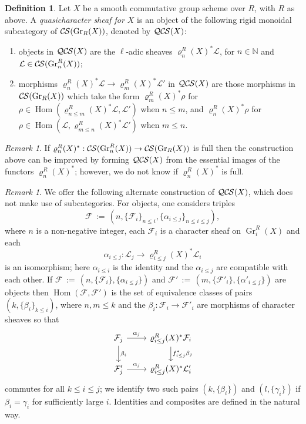 \documentclass[10pt]{amsart}
\theoremstyle{plain}
\theoremstyle{definition}
\newtheorem{definition}[theorem]{Definition}
\theoremstyle{remark}
\newtheorem{remark}[theorem]{Remark}
\newcommand{\NN}{{\mathbb{N}}}
\DeclareMathOperator{\Hom}{Hom}
\DeclareMathOperator{\Gr}{Gr}
\newcommand{\ceq}{{\, :=\, }}
\newcommand{\cs}[1]{{\mathcal{#1}}}
\newcommand{\CS}{{\mathcal{C\hskip-0.8pt S}}}
\newcommand{\QCS}{{\mathcal{QC\hskip-0.8pt S}}}
\begin{document}
\begin{definition}\label{def:QCS}
Let $X$ be a smooth commutative group scheme over $R$, with $R$ as above.
A {\it quasicharacter sheaf for $X$} is an object of
the following rigid monoidal subcategory of $\CS(\Gr_R(X))$, denoted by $\QCS(X)$:
\begin{enumerate}
\item
objects in $\QCS(X)$ are the $\ell$-adic sheaves $\varrho^R_n(X)^*\cs{L}$, for $n\in \NN$ and $\cs{L} \in \CS(\Gr^R_n(X))$; 
\item
morphisms $\varrho^R_n(X)^*\cs{L} \to \varrho^R_m(X)^*\cs{L}'$ in $\QCS(X)$ are those morphisms in $\CS(\Gr_R(X))$ which take the form $\varrho^R_m(X)^*\rho$ for $\rho \in \Hom(\varrho^R_{n\leq m}(X)^*\cs{L},\cs{L}')$ when $n\leq m$, and $\varrho^R_n(X)^*\rho$ for $\rho \in \Hom(\cs{L},\varrho^R_{m\leq n}(X)^*\cs{L}')$ when $m\leq n$.
\end{enumerate}

\end{definition}


\begin{remark}
If $\varrho^R_n(X)^* : \CS(\Gr^R_n(X)) \to \CS(\Gr_R(X))$ is full then the construction above can be improved by forming $\QCS(X)$ from the essential images of the functors $\varrho^R_n(X)^*$; however, we do not know if $\varrho^R_n(X)^*$ is full.
\end{remark}

\begin{remark}
We offer the following alternate construction of $\QCS(X)$, which does not make use of subcategories.
For objects, one considers triples 
\[
\cs{F} \ceq (n, \{\cs{F}_i\}_{n\leq i}, \{\alpha_{i \le j}\}_{n\le i \le j}),
\] where $n$
is a non-negative integer, each $\cs{F}_i$ is a character sheaf on $\Gr^R_i(X)$ and each 
\[
\alpha_{i \le j} : \cs{L}_j \to \varrho^R_{i \le j}(X)^* \cs{L}_i
\]
 is an isomorphism; here $\alpha_{i \le i}$ is the identity and the $\alpha_{i \le j}$ are compatible with each other.  
If $\cs{F} \ceq (n, \{\cs{F}_i\}, \{\alpha_{i \le j}\})$
and $\cs{F}' \ceq (m, \{\cs{F}'_i\}, \{\alpha'_{i \le j}\})$ are objects then $\Hom(\cs{F}, \cs{F}')$ is the set
of equivalence classes of pairs $(k, \{\beta_i\}_{k \le i})$, where $n,m \le k$ and the $\beta_i : \cs{F}_i \to \cs{F}'_i$ are
morphisms of character sheaves so that
\[
\begin{tikzcd}
\cs{F}_j \rar{\alpha_j} \dar{\beta_i} & \varrho^R_{i \le j}(X)^* \cs{F}_i \dar{f_{i \le j}^*\beta_j} \\
\cs{F}'_j \rar{\alpha_j} & \varrho^R_{i \le j}(X)^* \cs{L}'_i
\end{tikzcd}
\]
commutes for all $k\le i\le j$; we identify two such pairs $(k, \{\beta_i\})$ and $(l, \{\gamma_i\})$ if $\beta_i = \gamma_i$
for sufficiently large $i$.  Identities and composites are defined in the natural way.
\end{remark}
\end{document}
